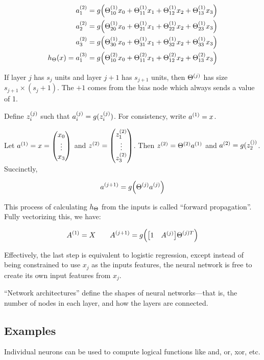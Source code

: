 \begin{align*}
  a\ss{1}{2} &= g\qty( \Theta\ss{10}{1}x_0 + \Theta\ss{11}{1}x_1 + \Theta\ss{12}{1}x_2 + \Theta\ss{13}{1}x_3 ) \\
  a\ss{2}{2} &= g\qty( \Theta\ss{20}{1}x_0 + \Theta\ss{21}{1}x_1 + \Theta\ss{22}{1}x_2 + \Theta\ss{23}{1}x_3 ) \\
  a\ss{3}{2} &= g\qty( \Theta\ss{30}{1}x_0 + \Theta\ss{31}{1}x_1 + \Theta\ss{32}{1}x_2 + \Theta\ss{33}{1}x_3 ) \\
  \hTh(x)  = a\ss{1}{3} &= g\qty( \Theta\ss{10}{2}x_0 + \Theta\ss{11}{2}x_1 + \Theta\ss{12}{2}x_2 + \Theta\ss{13}{2}x_3 ) \\
\end{align*}

If layer $j$ has $s_j$ units and layer $j+1$ has $s_{j+1}$ units, 
then $\Theta\s{j}$ has size $s_{j+1} \times (s_j + 1)$.
The $+1$ comes from the bias node which always sends a value of 1.

Define $z\ss{i}{j}$ such that $a\ss{i}{j} = g(z\ss{i}{j})$.
For consistency, write $a\s{1} = x$.

Let $a\s{1} = x = \mqty(x_0 \\ \vdots \\ x_3)$ 
and $z\s{2} = \mqty(z\ss{1}{2} \\ \vdots \\ z\ss{3}{2})$.
Then $z\s{2} = \Theta\s{2}a\s{1}$ and $a\s{2} = g(z\ss{2})$.
Succinctly, 

\[ a\s{j+1} = g\qty( \Theta\s{j} a\s{j} ) \]

This process of calculating $\hTh$ from the inputs is called ``forward propagation''.
Fully vectorizing this, we have:

\[ 
  A\s{1} = X \qquad
  A\s{j+1} = g\qty( \mqty[ 1 & A\s{j} ] \Theta^{(j)T} )
\]

Effectively, the last step is equivalent to logistic regression,
except instead of being constrained to use $x_j$ as the inputs features,
the neural network is free to create its own input features from $x_j$.

``Network architectures'' define the shapes of neural networks---that is,
the number of nodes in each layer, and how the layers are connected.

\subsection{Examples}

Individual neurons can be used to compute logical functions like and, or, xor, etc.

